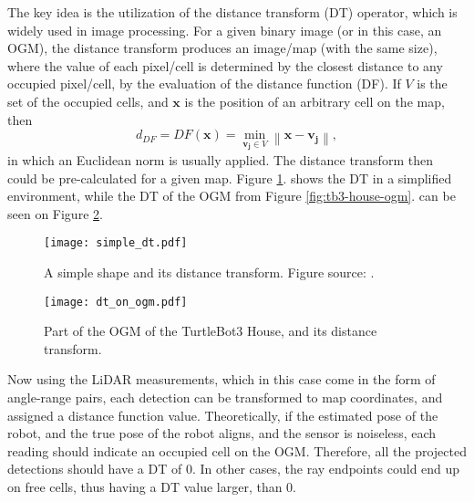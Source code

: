 The key idea is the utilization of the distance transform (DT) operator, which is widely used in
image processing.
For a given binary image (or in this case, an OGM), the distance transform
produces an image/map (with the same size), where the value of each pixel/cell is
determined by the closest distance to any occupied pixel/cell,
by the evaluation of the distance function (DF).
If $V$ is the set of the occupied cells, and $\mathbf{x}$ is the position of an arbitrary cell on the map, then
\begin{equation}
    d_{D F}=D F(\mathbf{x})=\min _{\mathbf{v}_{\mathbf{j}} \in V}\left\|\mathbf{x}-\mathbf{v}_{\mathbf{j}}\right\|,
\end{equation}
in which an Euclidean norm is usually applied.
The distance transform then could be pre-calculated for a given map.
Figure \ref{fig:simple-dt}. shows the DT in a simplified environment,
while the DT of the OGM from Figure \ref{fig:tb3-house-ogm}. can be seen on Figure \ref{fig:gazebo-map-ogm-dt}.
\begin{figure}[htbp]
    \centering
    \texttt{[image: simple\_dt.pdf]}
    \caption{A simple shape and its distance transform. Figure source: \cite{Dantanarayana2016b}.}
    \label{fig:simple-dt}
\end{figure}
\begin{figure}[htbp]
    \centering
    \texttt{[image: dt\_on\_ogm.pdf]}
    \caption{Part of the OGM of the TurtleBot3 House, and its distance transform.}
    \label{fig:gazebo-map-ogm-dt}
\end{figure}

Now using the LiDAR measurements, which in this case come in the form of angle-range pairs,
each detection can be transformed to map coordinates, and assigned a distance function value.
Theoretically, if the estimated pose of the robot, and the true pose of the robot aligns,
and the sensor is noiseless, each reading should indicate an occupied cell on the OGM.
Therefore, all the projected detections should have a DT of 0.
In other cases, the ray endpoints could end up on free cells, thus having a DT value larger,
than 0.

